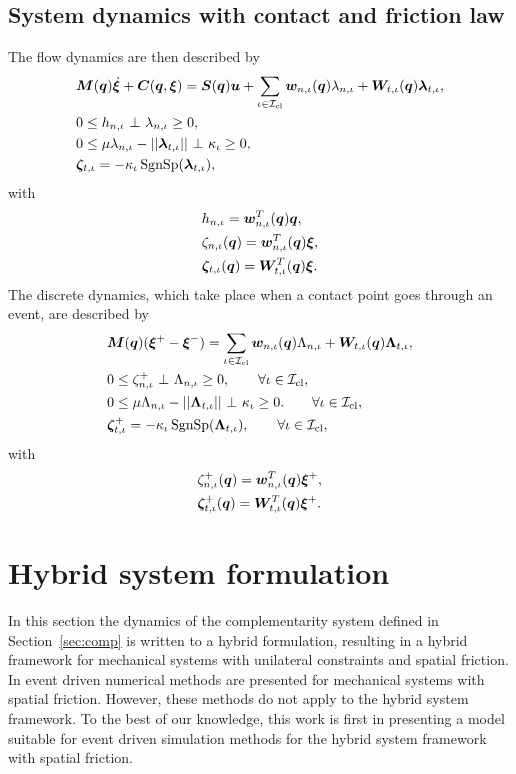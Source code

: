 \documentclass[../DC2017114Bouma.tex]{subfiles}
\begin{document}
\subsection{System dynamics with contact and friction law}
The flow dynamics are then described by
\begin{align}
&\Mb(\qb)\dot{\xib} + \Cb(\qb,\xib) = \Sb(\qb)\ub + \sum_{\iota\in\Ic_{\text{cl}}}\wb_{n,\iota}(\qb)\lambda_{n,\iota} + \Wb_{t,\iota}(\qb)\lambdab_{t,\iota}, \label{eq:ncpcontact1}\\
&0\leq h_{n,\iota}\ \bot\ \lambda_{n,\iota} \geq 0,\label{eq:ncpcontact2}\\
&0\leq \mu\lambda_{n,\iota} - ||\lambdab_{t,\iota}||\ \bot\ \kappa_{\iota} \geq 0,\label{eq:ncpcontact3}\\
&\zetab_{t,\iota} = -\kappa_{\iota}\SgnSp(\lambdab_{t,\iota}),\label{eq:ncpcontact4}
\end{align}
with 
\begin{align}
&h_{n,\iota} = {\boldsymbol{w}}_{n,\iota}^T({\boldsymbol{q}}){\boldsymbol{q}},\label{eq:h}\\
&\zeta_{n,\iota}({\boldsymbol{q}}) = {\boldsymbol{w}}^T_{n,\iota}({\boldsymbol{q}}) \boldsymbol{\xi},  \label{eq:zetan}\\
&\boldsymbol{\zeta}_{t,\iota}({\boldsymbol{q}}) = {\boldsymbol{W}}^T_{t,\iota}({\boldsymbol{q}}) \boldsymbol{\xi}. \label{eq:zetab}
\end{align}
The discrete dynamics, which take place when a contact point goes through an event, are described by
\begin{align}
&\Mb(\qb)(\xib^+ - \xib^-) = \sum_{\iota\in\Ic_{\text{cl}}} \wb_{n,\iota}(\qb)\Lambda_{n,\iota} + \Wb_{t,\iota}(\qb)\Lambdab_{t,\iota}, \label{eq:ncpimpact1}\\
&0\leq \zeta_{n,\iota}^+\ \bot\ \Lambda_{n,\iota} \geq 0, \qquad \forall \iota\in\Ic_{\text{cl}},\label{eq:ncpimpact2}\\
&0 \leq \mu\Lambda_{n,\iota} - ||\Lambdab_{t,\iota}||\ \bot\ \kappa_{\iota} \geq 0. \qquad \forall \iota\in\Ic_{\text{cl}},\label{eq:ncpimpact3}\\
&\zetab_{t,\iota}^+ = -\kappa_{\iota}\SgnSp(\Lambdab_{t,\iota}),\qquad \forall \iota\in\Ic_{\text{cl}},\label{eq:ncpimpact4}
\end{align}
with 
\begin{align}
&\zeta^+_{n,\iota}({\boldsymbol{q}}) = {\boldsymbol{w}}^T_{n,\iota}({\boldsymbol{q}}) \boldsymbol{\xi}^+,\\
&\boldsymbol{\zeta}^+_{t,\iota}({\boldsymbol{q}}) = {\boldsymbol{W}}^T_{t,\iota}({\boldsymbol{q}}) \boldsymbol{\xi}^+.\label{eq:ncpimpactend}
\end{align}

\section{Hybrid system formulation}
In this section the dynamics of the complementarity system defined in Section~\ref{sec:comp} is written to a hybrid formulation, resulting in a hybrid framework for mechanical systems with unilateral constraints and spatial friction. In \cite[p. 222]{Acary2008} event driven numerical methods are presented for mechanical systems with spatial friction. However, these methods do not apply to the hybrid system framework. To the best of our knowledge, this work is first in presenting a model suitable for event driven simulation methods for the hybrid system framework with spatial friction.
\end{document}
